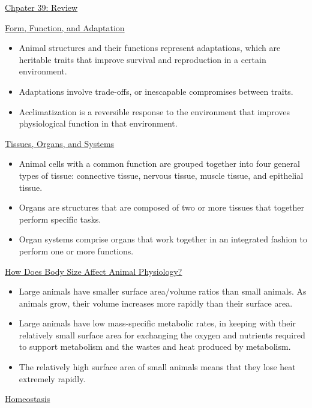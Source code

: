 \documentclass[12pt,letterpaper]{article}
\begin{document}
\hypertarget{39.r}{}
\begin{probbox}{\hyperlink{39}{Chpater 39: Review}}\end{probbox}
    \hyperlink{39.1}{Form, Function, and Adaptation}
    \begin{itemize}
            \item Animal structures and their functions represent adaptations, which are heritable traits that improve survival and reproduction in a certain environment.
            \item Adaptations involve trade-offs, or inescapable compromises between traits.
            \item Acclimatization is a reversible response to the environment that improves physiological function in that environment.
        \end{itemize}
    \hyperlink{39.2}{Tissues, Organs, and Systems}
    \begin{itemize}
            \item Animal cells with a common function are grouped together into
            four general types of tissue: connective tissue, nervous tissue, muscle tissue, and epithelial tissue.
            \item Organs are structures that are composed of two or more tissues that together perform specific tasks.
            \item Organ systems comprise organs that work together in an integrated fashion to perform one or more functions.
    \end{itemize}
    \hyperlink{39.3}{How Does Body Size Affect Animal Physiology?}
    \begin{itemize}
            \item Large animals have smaller surface area/volume ratios than small animals. As animals grow, their volume increases more rapidly than their surface area. 
            \item Large animals have low mass-specific metabolic rates, in keeping with their relatively small surface area for exchanging the oxygen and nutrients required to support metabolism and the wastes and heat produced by metabolism.
            \item The relatively high surface area of small animals means that they lose heat extremely rapidly.
    \end{itemize}
    \hyperlink{39.4}{Homeostasis}
\end{document}
